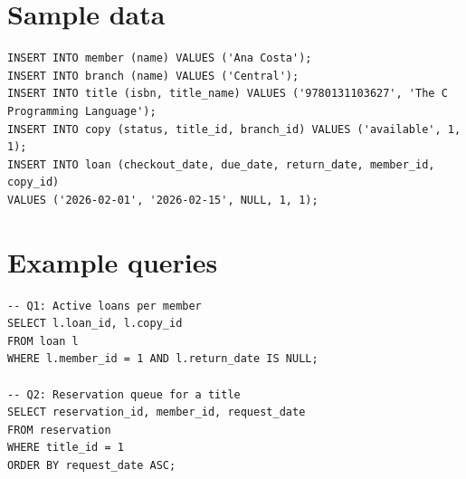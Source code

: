 \section{Sample data}
\begin{verbatim}
INSERT INTO member (name) VALUES ('Ana Costa');
INSERT INTO branch (name) VALUES ('Central');
INSERT INTO title (isbn, title_name) VALUES ('9780131103627', 'The C Programming Language');
INSERT INTO copy (status, title_id, branch_id) VALUES ('available', 1, 1);
INSERT INTO loan (checkout_date, due_date, return_date, member_id, copy_id)
VALUES ('2026-02-01', '2026-02-15', NULL, 1, 1);
\end{verbatim}

\section{Example queries}
\begin{verbatim}
-- Q1: Active loans per member
SELECT l.loan_id, l.copy_id
FROM loan l
WHERE l.member_id = 1 AND l.return_date IS NULL;

-- Q2: Reservation queue for a title
SELECT reservation_id, member_id, request_date
FROM reservation
WHERE title_id = 1
ORDER BY request_date ASC;
\end{verbatim}
